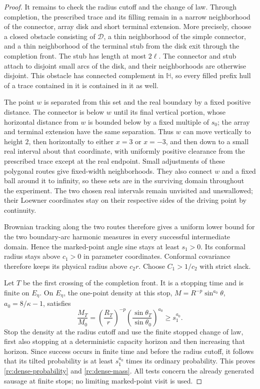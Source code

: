 \begin{proof}
It remains to check the radius cutoff and the change of law.  Through
completion, the prescribed trace and its filling remain in a narrow
neighborhood of the connector, array disk and short terminal extension.
More precisely, choose a closed obstacle consisting of $\mathcal D$,
a thin neighborhood of the simple connector, and a thin neighborhood of
the terminal stub from the disk exit through the completion front.
The stub has length at most $2\ell$. The connector and stub attach to
disjoint small arcs of the disk, and their neighborhoods are otherwise
disjoint. This obstacle has
connected complement in $\mathbb H$, so every filled prefix hull of a
trace contained in it is contained in it as well.

The point $w$ is separated from this set and the real boundary by a
fixed positive distance.  The connector is below $w$ until its final
vertical portion, whose horizontal distance from $w$ is bounded below
by a fixed multiple of $s_0$; the array and terminal extension have the
same separation.  Thus $w$ can move vertically to height $2$, then
horizontally to either $x=3$ or $x=-3$, and then down to a small real
interval about that coordinate, with uniformly positive clearance from
the prescribed trace except at the real endpoint.  Small adjustments
of these polygonal routes give fixed-width neighborhoods.  They also
connect $w$ and a fixed ball around it to infinity, so these sets are
in the surviving domain throughout the experiment.  The two chosen
real intervals remain unvisited and unswallowed; their Loewner
coordinates stay on their respective sides of the driving point by
continuity.

Brownian tracking along the two routes therefore gives
a uniform lower bound for the two boundary-arc harmonic measures in
every successful intermediate domain.  Hence the
marked-point angle sine stays at least $s_1>0$.  Its conformal radius
stays above $c_1>0$ in parameter coordinates.  Conformal covariance
therefore keeps its physical radius above $c_2r$.  Choose $C_1>1/c_2$
with strict slack.

Let $T$ be the first crossing of the completion front. It is a stopping
time and is finite on $E_\eta$. On $E_\eta$, the one-point density at
this stop,
$M=R^{-p}\sin^{a_0}\theta$, $a_0=8/\kappa-1$, satisfies
\[
 \frac{M_T}{M_0}
 =\left(\frac{R_T}{r}\right)^{-p}
     \left(\frac{\sin\theta_T}{\sin\theta_0}\right)^{a_0}
 \ge s_1^{a_0}.
\]
Stop the density at the radius cutoff and use the finite stopped
change of law, first also stopping at a deterministic capacity horizon
and then increasing that horizon.  Since success occurs in finite
time and before the radius cutoff, it follows that its tilted
probability is at least $s_1^{a_0}$ times its ordinary probability.
This proves \eqref{rc:dense-probability} and
\eqref{rc:dense-mass}.  All tests concern the already generated
sausage at finite stops; no limiting marked-point visit is used.
\end{proof}
